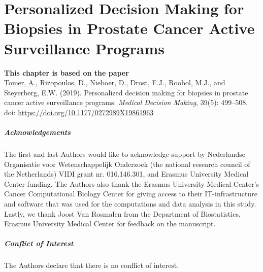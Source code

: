 \chapter[Personalized Decision Making for Biopsies in Prostate Cancer Active Surveillance Programs][Personalized Decision Making]{Personalized Decision Making for Biopsies in Prostate Cancer Active Surveillance Programs}
\label{c3}

\vspace*{\fill}
\textbf{This chapter is based on the paper}\\
\underline{Tomer, A.}, Rizopoulos, D., Nieboer, D., Drost, F.J., Roobol, M.J., and Steyerberg, E.W. (2019). Personalized decision making for biopsies in prostate cancer active surveillance programs. \emph{Medical Decision Making}, 39(5): 499--508. doi: \url{https://doi.org/10.1177/0272989X19861963}

\clearpage

\clearpage





\paragraph{Acknowledgements}
The first and last Authors would like to acknowledge support by Nederlandse Organisatie voor Wetenschappelijk Onderzoek (the national research council of the Netherlands) VIDI grant nr. 016.146.301, and Erasmus University Medical Center funding. The Authors also thank the Erasmus University Medical Center's Cancer Computational Biology Center for giving access to their IT-infrastructure and software that was used for the computations and data analysis in this study. Lastly, we thank Joost Van Rosmalen from the Department of Biostatistics, Erasmus University Medical Center for feedback on the manuscript.

\paragraph{Conflict of Interest}
The Authors declare that there is no conflict of interest.



\clearpage

